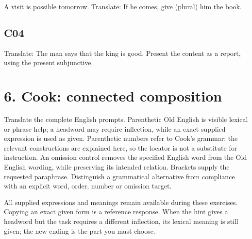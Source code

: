 A visit is possible tomorrow. Translate: If he comes, give (plural) him the book.


\subsection*{C04}

Translate: The man says that the king is good. Present the content as a report, using the present subjunctive.


\section*{6. Cook: connected composition}

Translate the complete English prompts. Parenthetic Old English is visible lexical or phrase help; a headword may require inflection, while an exact supplied expression is used as given. Parenthetic numbers refer to Cook’s grammar: the relevant constructions are explained here, so the locator is not a substitute for instruction. An omission control removes the specified English word from the Old English wording, while preserving its intended relation. Brackets supply the requested paraphrase. Distinguish a grammatical alternative from compliance with an explicit word, order, number or omission target.

All supplied expressions and meanings remain available during these exercises. Copying an exact given form is a reference response. When the hint gives a headword but the task requires a different inflection, its lexical meaning is still given; the new ending is the part you must choose.

